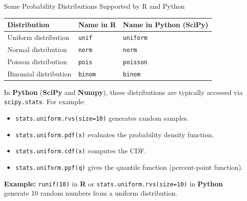 \documentclass[8pt]{beamer}
\begin{document}
\begin{frame}{Some Probability Distributions Supported by R and Python}
\begin{tabular}{lll}
Distribution & Name in R & Name in Python (SciPy)\\
\hline
Uniform distribution & \texttt{unif} & \texttt{uniform}\\
Normal distribution & \texttt{norm} & \texttt{norm}\\
Poisson distribution & \texttt{pois} & \texttt{poisson}\\
Binomial distribution & \texttt{binom} & \texttt{binom}\\
\end{tabular}
\vspace{3mm}

In {\bf Python} (\textbf{SciPy} and \textbf{Numpy}), these distributions are typically accessed via \texttt{scipy.stats}. For example:
\begin{itemize}
  \item \texttt{stats.uniform.rvs(size=10)} generates random samples.
  \item \texttt{stats.uniform.pdf(x)} evaluates the probability density function.
  \item \texttt{stats.uniform.cdf(x)} computes the CDF.
  \item \texttt{stats.uniform.ppf(q)} gives the quantile function (percent-point function).
\end{itemize}

{\bf Example:}  
\texttt{runif(10)} in {\bf R} or \texttt{stats.uniform.rvs(size=10)} in {\bf Python} generate 10 random numbers from a uniform distribution.
\end{frame}
\end{document}
